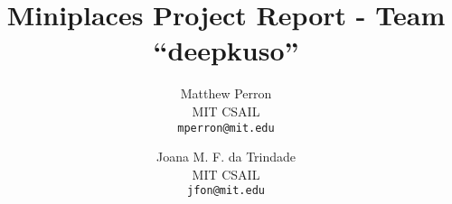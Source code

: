 \documentclass[10pt,twocolumn,letterpaper]{article}
\begin{document}
\title{Miniplaces Project Report - Team ``deepkuso''}

\author{Matthew Perron\\
MIT CSAIL\\
{\tt\small mperron@mit.edu}
\and
Joana M. F. da Trindade\\
MIT CSAIL\\
{\tt\small jfon@mit.edu}
}

\maketitle







{\small


}
\end{document}
